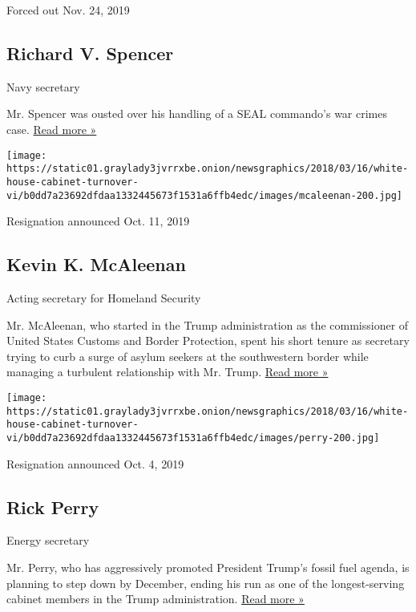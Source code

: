 Forced out Nov. 24, 2019

\hypertarget{richard-v-spencer}{%
\subsection{Richard V. Spencer}\label{richard-v-spencer}}

Navy secretary

Mr. Spencer was ousted over his handling of a SEAL commando's war crimes
case.
\href{https://www.nytimes3xbfgragh.onion/2019/11/24/us/politics/navy-secretary-richard-spencer-resign.html}{Read
more »}

\texttt{[image: https://static01.graylady3jvrrxbe.onion/newsgraphics/2018/03/16/white-house-cabinet-turnover-vi/b0dd7a23692dfdaa1332445673f1531a6ffb4edc/images/mcaleenan-200.jpg]}

Resignation announced Oct. 11, 2019

\hypertarget{kevin-k-mcaleenan}{%
\subsection{Kevin K. McAleenan}\label{kevin-k-mcaleenan}}

Acting secretary for Homeland Security

Mr. McAleenan, who started in the Trump administration as the
commissioner of United States Customs and Border Protection, spent his
short tenure as secretary trying to curb a surge of asylum seekers at
the southwestern border while managing a turbulent relationship with Mr.
Trump.
\href{https://www.nytimes3xbfgragh.onion/2019/10/11/us/politics/kevin-mcaleenan-homeland-security.html}{Read
more »}

\texttt{[image: https://static01.graylady3jvrrxbe.onion/newsgraphics/2018/03/16/white-house-cabinet-turnover-vi/b0dd7a23692dfdaa1332445673f1531a6ffb4edc/images/perry-200.jpg]}

Resignation announced Oct. 4, 2019

\hypertarget{rick-perry}{%
\subsection{Rick Perry}\label{rick-perry}}

Energy secretary

Mr. Perry, who has aggressively promoted President Trump's fossil fuel
agenda, is planning to step down by December, ending his run as one of
the longest-serving cabinet members in the Trump administration.
\href{https://www.nytimes3xbfgragh.onion/2019/10/04/climate/rick-perry-energy-secretary.html}{Read
more »}


